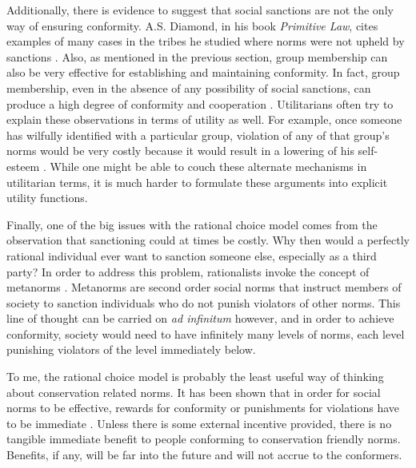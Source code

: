 \documentclass[rutwik_proposal.tex]{subfiles}
\begin{document}
Additionally, there is evidence to suggest that social sanctions are not the only way of ensuring conformity. A.S. Diamond, in his book \textit{Primitive Law}, cites examples of many cases in the tribes he studied where norms were not upheld by sanctions \cite{Diamond71}. Also, as mentioned in the previous section, group membership can also be very effective for establishing and maintaining conformity. In fact, group membership, even in the absence of any possibility of social sanctions, can produce a high degree of conformity and cooperation \cite{Kramer84}. Utilitarians often try to explain these observations in terms of utility as well. For example, once someone has wilfully identified with a particular group, violation of any of that group's norms would be very costly because it would result in a lowering of his self-esteem \cite{Axelrod86}. While one might be able to couch these alternate mechanisms in utilitarian terms, it is much harder to formulate these arguments into explicit utility functions.

Finally, one of the big issues with the rational choice model comes from the observation that sanctioning could at times be costly. Why then would a perfectly rational individual ever want to sanction someone else, especially as a third party? In order to address this problem, rationalists invoke the concept of metanorms \cite{Axelrod86}. Metanorms are second order social norms that instruct members of society to sanction individuals who do not punish violators of other norms. This line of thought can be carried on \textit{ad infinitum} however, and in order to achieve conformity, society would need to have infinitely many levels of norms, each level punishing violators of the level immediately below.

To me, the rational choice model is probably the least useful way of thinking about conservation related norms. It has been shown that in order for social norms to be effective, rewards for conformity or punishments for violations have to be immediate \cite{Fehr16}. Unless there is some external incentive provided, there is no tangible immediate benefit to people conforming to conservation friendly norms. Benefits, if any, will be far into the future and will not accrue to the conformers. 
\end{document}
